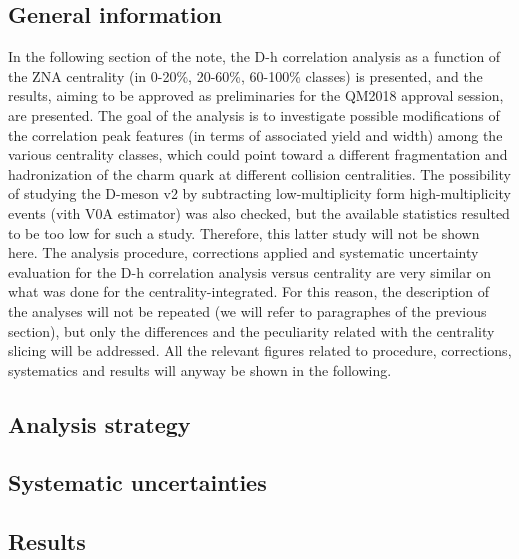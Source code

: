 \subsection{General information}
In the following section of the note, the D-h correlation analysis as a function of the ZNA centrality (in 0-20\%, 20-60\%, 60-100\% classes) is presented, and the results, aiming to be approved as preliminaries for the QM2018 approval session, are presented.
The goal of the analysis is to investigate possible modifications of the correlation peak features (in terms of associated yield and width) among the various centrality classes, which could point toward a different fragmentation and hadronization of the charm quark at different collision centralities.
The possibility of studying the D-meson v2 by subtracting low-multiplicity form high-multiplicity events (vith V0A estimator) was also checked, but the available statistics resulted to be too low for such a study. Therefore, this latter study will not be shown here.
The analysis procedure, corrections applied and systematic uncertainty evaluation for the D-h correlation analysis versus centrality are very similar on what was done for the centrality-integrated. For this reason, the description of the analyses will not be repeated (we will refer to paragraphes of the previous section), but only the differences and the peculiarity related with the centrality slicing will be addressed.
All the relevant figures related to procedure, corrections, systematics and results will anyway be shown in the following.

\subsection{Analysis strategy}


\subsection{Systematic uncertainties}


\subsection{Results}


